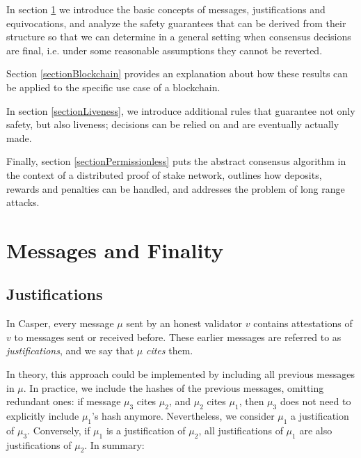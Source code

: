 \documentclass[12pt]{article}
\begin{document}
In section \ref{sectionMessages} we introduce the basic concepts of messages, justifications and equivocations, and analyze the safety guarantees that can be derived from their structure so that we can determine in a general setting when consensus decisions are final, i.e. under some reasonable assumptions they cannot be reverted.

Section \ref{sectionBlockchain} provides an explanation about how these results can be applied to the specific use case of a blockchain.

In section \ref{sectionLiveness}, we introduce additional rules that guarantee not only safety, but also liveness; decisions can be relied on and are eventually actually made.

Finally, section \ref{sectionPermissionless} puts the abstract consensus algorithm in the context of a distributed proof of stake network, outlines how deposits, rewards and penalties can be handled, and addresses the problem of long range attacks.

\newpage


\section{Messages and Finality}
\label{sectionMessages}


\subsection{Justifications}

In Casper, every message $\mu$ sent by an honest validator $v$ contains attestations of $v$ to messages sent or received before. These earlier messages are referred to as \emph{justifications}, and we say that $\mu$ \emph{cites} them.

In theory, this approach could be implemented by including all previous messages in $\mu$. In practice, we include the hashes of the previous messages, omitting redundant ones: if message $\mu_3$ cites $\mu_2$, and $\mu_2$ cites $\mu_1$, then $\mu_3$ does not need to explicitly include $\mu_1$'s hash anymore. Nevertheless, we consider $\mu_1$ a justification of $\mu_3$. Conversely, if $\mu_1$ is a justification of $\mu_2$, all justifications of $\mu_1$ are also justifications of $\mu_2$.  In summary:
\end{document}
